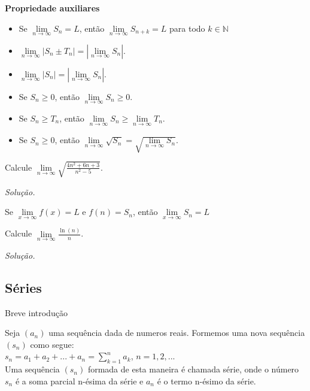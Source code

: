 \newpage
\textbf{Propriedade auxiliares}
\begin{itemize}
	\item Se  $\lim\limits_{n\longrightarrow \infty} S_{n}=L$, então $\lim\limits_{n\longrightarrow \infty} S_{n+k}=L$ para todo $k\in \mathbb{N} $
	\item $\lim\limits_{n\longrightarrow \infty} \left|  S_{n}\pm T_{n}\right|  =\left| \lim\limits_{n\longrightarrow \infty}  S_{n}\right| $.
	\item $\lim\limits_{n\longrightarrow \infty} \left|  S_{n}\right|  =\left| \lim\limits_{n\longrightarrow \infty}  S_{n}\right| $.
	\item Se $S_{n}\geq 0$, então $\lim\limits_{n\longrightarrow \infty} S_{n} \geq 0$.
	\item Se $S_{n}\geq T_{n}$, então $\lim\limits_{n\longrightarrow \infty} S_{n} \geq \lim\limits_{n\longrightarrow \infty}T_{n}$.
	\item Se $S_{n}\geq 0$, então $\lim\limits_{n\longrightarrow \infty} \sqrt{S_{n}} =\sqrt{\lim\limits_{n\longrightarrow \infty} S_{n} }$.
\end{itemize}
\begin{ex}
	Calcule $\lim\limits_{n\longrightarrow \infty}\sqrt{\frac{4n^{2}+6n+3}{n^{2}-5}} $.
\end{ex}
\textit{Solução.}
\vspace*{5cm}
\begin{teo} 
	Se $\lim\limits_{x\longrightarrow \infty} f(x)=L$ e $f(n)=S_{n}$, então $\lim\limits_{x\longrightarrow \infty} S_{n}=L$
\end{teo}
\begin{ex}
	Calcule $\lim\limits_{n\longrightarrow \infty}\frac{\ln (n)}{n} $.
\end{ex}
\textit{Solução.}
\vspace*{5cm}
\begin{center}
\section{Séries}
\end{center}
Breve introdução
\vspace*{5cm}
\begin{df}
	Seja $\left( a_{n}\right) $ uma sequência dada de numeros reais. Formemos uma nova sequência $\left( s_{n}\right) $ como segue:\\
	$s_{n}=a_{1}+a_{2}+...+a_{n}=\sum_{k=1}^{n} a_{k}$, $n=1,2,...$\\
	Uma sequência $\left( s_{n}\right)$ formada de esta maneira é chamada série, onde o número $s_{n}$ é a soma parcial n-ésima da série e $a_{n}$ é o termo n-ésimo da série.
\end{df}
